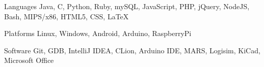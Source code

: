 
\vspace{-2mm}
\begin{cvskills}

  \cvskill
    {Languages} %
    {Java, C, Python, Ruby, mySQL, JavaScript, PHP, jQuery, NodeJS, Bash, MIPS/x86, HTML5, CSS, LaTeX} %

  \cvskill
    {Platforms} %
    {Linux, Windows, Android, Arduino, RaspberryPi} %

  \cvskill
    {Software} %
    {Git, GDB, IntelliJ IDEA, CLion, Arduino IDE, MARS, Logisim, KiCad, Microsoft Office} %

\end{cvskills}
